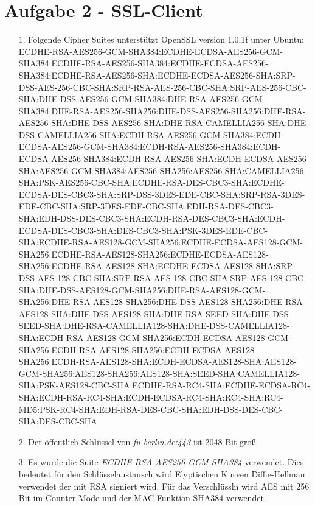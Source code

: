 \documentclass{scrartcl}
\begin{document}
\section*{Aufgabe 2 - SSL-Client}
\begin{itemize}
  \item[1.] Folgende Cipher Suites unterstützt OpenSSL version 1.0.1f unter
    Ubuntu:
    ECDHE-RSA-AES256-GCM-SHA384:ECDHE-ECDSA-AES256-GCM-SHA384:ECDHE-RSA-AES256-SHA384:ECDHE-ECDSA-AES256-SHA384:ECDHE-RSA-AES256-SHA:ECDHE-ECDSA-AES256-SHA:SRP-DSS-AES-256-CBC-SHA:SRP-RSA-AES-256-CBC-SHA:SRP-AES-256-CBC-SHA:DHE-DSS-AES256-GCM-SHA384:DHE-RSA-AES256-GCM-SHA384:DHE-RSA-AES256-SHA256:DHE-DSS-AES256-SHA256:DHE-RSA-AES256-SHA:DHE-DSS-AES256-SHA:DHE-RSA-CAMELLIA256-SHA:DHE-DSS-CAMELLIA256-SHA:ECDH-RSA-AES256-GCM-SHA384:ECDH-ECDSA-AES256-GCM-SHA384:ECDH-RSA-AES256-SHA384:ECDH-ECDSA-AES256-SHA384:ECDH-RSA-AES256-SHA:ECDH-ECDSA-AES256-SHA:AES256-GCM-SHA384:AES256-SHA256:AES256-SHA:CAMELLIA256-SHA:PSK-AES256-CBC-SHA:ECDHE-RSA-DES-CBC3-SHA:ECDHE-ECDSA-DES-CBC3-SHA:SRP-DSS-3DES-EDE-CBC-SHA:SRP-RSA-3DES-EDE-CBC-SHA:SRP-3DES-EDE-CBC-SHA:EDH-RSA-DES-CBC3-SHA:EDH-DSS-DES-CBC3-SHA:ECDH-RSA-DES-CBC3-SHA:ECDH-ECDSA-DES-CBC3-SHA:DES-CBC3-SHA:PSK-3DES-EDE-CBC-SHA:ECDHE-RSA-AES128-GCM-SHA256:ECDHE-ECDSA-AES128-GCM-SHA256:ECDHE-RSA-AES128-SHA256:ECDHE-ECDSA-AES128-SHA256:ECDHE-RSA-AES128-SHA:ECDHE-ECDSA-AES128-SHA:SRP-DSS-AES-128-CBC-SHA:SRP-RSA-AES-128-CBC-SHA:SRP-AES-128-CBC-SHA:DHE-DSS-AES128-GCM-SHA256:DHE-RSA-AES128-GCM-SHA256:DHE-RSA-AES128-SHA256:DHE-DSS-AES128-SHA256:DHE-RSA-AES128-SHA:DHE-DSS-AES128-SHA:DHE-RSA-SEED-SHA:DHE-DSS-SEED-SHA:DHE-RSA-CAMELLIA128-SHA:DHE-DSS-CAMELLIA128-SHA:ECDH-RSA-AES128-GCM-SHA256:ECDH-ECDSA-AES128-GCM-SHA256:ECDH-RSA-AES128-SHA256:ECDH-ECDSA-AES128-SHA256:ECDH-RSA-AES128-SHA:ECDH-ECDSA-AES128-SHA:AES128-GCM-SHA256:AES128-SHA256:AES128-SHA:SEED-SHA:CAMELLIA128-SHA:PSK-AES128-CBC-SHA:ECDHE-RSA-RC4-SHA:ECDHE-ECDSA-RC4-SHA:ECDH-RSA-RC4-SHA:ECDH-ECDSA-RC4-SHA:RC4-SHA:RC4-MD5:PSK-RC4-SHA:EDH-RSA-DES-CBC-SHA:EDH-DSS-DES-CBC-SHA:DES-CBC-SHA
  \item[2.] Der öffentlich Schlüssel von \textit{fu-berlin.de:443} ist 2048 Bit
    groß.
  \item[3.] Es wurde die Suite \textit{ECDHE-RSA-AES256-GCM-SHA384} verwendet.
    Dies bedeutet für den Schlüsselaustausch wird Elyptischen Kurven
    Diffie-Hellman verwendet der mit RSA signiert wird. Für das Verschlüssln
    wird AES mit 256 Bit im Counter Mode und der MAC Funktion SHA384 verwendet.
\end{itemize}
\end{document}
